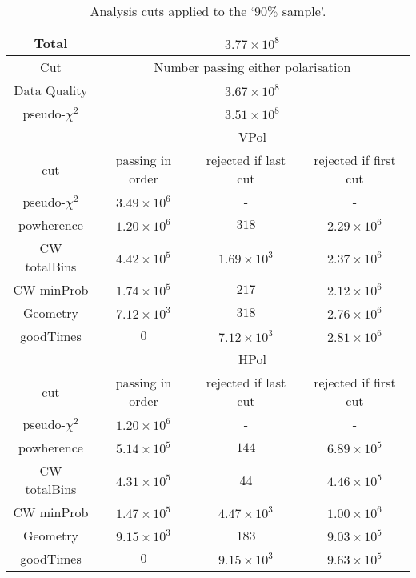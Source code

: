 \begin{table}
  \begin{center}
    \begin{tabular}{ c || c | c | c }
      Total & \multicolumn{3}{c}{ $3.77 \times 10^{8}$}\\
      \hline
      Cut & \multicolumn{3}{c}{ Number passing either polarisation}\\      
      \hline
      Data Quality & \multicolumn{3}{c}{$3.67 \times 10^8$}\\
      pseudo-$\chi^{2}$ & \multicolumn{3}{c}{$3.51 \times 10^8$}\\
      \hline\hline
      & \multicolumn{3}{c}{VPol}\\
      \hline
      cut & passing in order & rejected if last cut & rejected if first cut \\
      \hline
      pseudo-$\chi^{2}$ & $3.49 \times 10^6$ & - & -\\
      powherence & $1.20 \times 10^6$ & $318$ & $2.29 \times 10^6$\\
      CW totalBins & $4.42 \times 10^5$ & $1.69 \times 10^3$ & $2.37 \times 10^6$\\
      CW minProb & $1.74 \times 10^5$ & $217$ & $2.12 \times 10^6$\\
      Geometry & $7.12 \times 10^3$ & $318$ & $2.76 \times 10^6$\\
      goodTimes & $0$ & $7.12 \times 10^3$ & $2.81 \times 10^6$\\
      \hline\hline
      & \multicolumn{3}{c}{HPol}\\
      \hline
      cut & passing in order & rejected if last cut & rejected if first cut \\
      \hline
      pseudo-$\chi^{2}$ & $1.20 \times 10^6$ & - & -\\
      powherence & $5.14 \times 10^5$ & $144$ & $6.89 \times 10^5$\\
      CW totalBins & $4.31 \times 10^5$ & 44 & $4.46 \times 10^5$\\
      CW minProb & $1.47 \times 10^5$ & $4.47 \times 10^3$ & $1.00 \times 10^6$\\
      Geometry & $9.15 \times 10^3$ & 183 & $9.03 \times 10^5$\\
      goodTimes & $0$ & $9.15 \times 10^3$ & $9.63 \times 10^5$\\      
      \end{tabular} 
    \caption{Analysis cuts applied to the `$90 \%$ sample'.}
    \label{tab:Analysis:Cut-Flow}
  \end{center}
\end{table}

